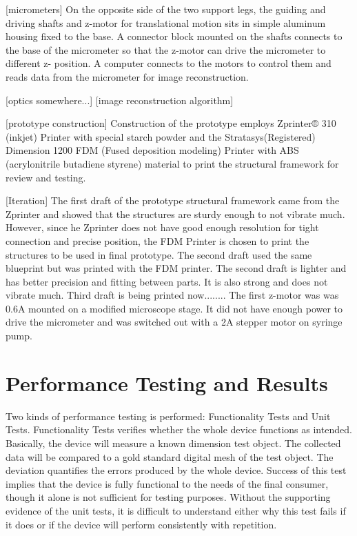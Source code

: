 \documentclass{article}
\begin{document}
[micrometers]
	On the opposite side of the two support legs, the guiding and driving shafts and z-motor for 
translational motion sits in simple aluminum housing fixed to the base. A connector block mounted on the 
shafts connects to the base of the micrometer so that the z-motor can drive the micrometer to different z-
position. A computer connects to the motors to control them and reads data from the micrometer for image 
reconstruction. 
	
[optics somewhere...]
[image reconstruction algorithm]

[prototype construction]
	Construction of the prototype employs Zprinter® 310 (inkjet) Printer with special starch powder 
and the Stratasys(Registered) Dimension 1200 FDM (Fused deposition modeling) Printer with ABS 
(acrylonitrile butadiene styrene) material to print the structural framework for review and testing.

[Iteration]
	The first draft of the prototype structural framework came from the Zprinter and showed that the 
structures are sturdy enough to not vibrate much. However, since he Zprinter does not have good enough 
resolution for tight connection and precise position, the FDM Printer is chosen to print the structures to be 
used in final prototype. The second draft used the same blueprint but was printed with the FDM printer. The 
second draft is lighter and has better precision and fitting between parts. It is also strong and does not 
vibrate much.  Third draft is being printed now........
	The first z-motor was was 0.6A mounted on a modified microscope stage. It did not have enough 
power to drive the micrometer and was switched out with a 2A stepper motor on syringe pump.


\section{Performance Testing and Results}
\label{sec:perf-test-results}

Two kinds of performance testing is performed: Functionality Tests and Unit Tests. Functionality Tests 
verifies whether the whole device functions as intended. Basically, the device will measure a known 
dimension test object. The collected data will be compared to a gold standard digital mesh of the test 
object. The deviation quantifies the errors produced by the whole device. Success of this test implies that 
the device is fully functional to the needs of the final consumer, though it alone is not sufficient for testing 
purposes. Without the supporting evidence of the unit tests, it is difficult to understand either why this test 
fails if it does or if the device will perform consistently with repetition.
\end{document}
